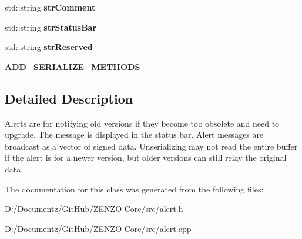 \begin{DoxyCompactItemize}
std\+::string {\bfseries str\+Comment}
\item 
\mbox{\label{class_c_unsigned_alert_a97cfbf9a49b770bb84e49389ac1489c2}} 
std\+::string {\bfseries str\+Status\+Bar}
\item 
\mbox{\label{class_c_unsigned_alert_a0115109fd39d48f37a412d5f50a78828}} 
std\+::string {\bfseries str\+Reserved}
\item 
\mbox{\label{class_c_unsigned_alert_a24489988876bbf2c38a5f379e4057a53}} 
{\bfseries A\+D\+D\+\_\+\+S\+E\+R\+I\+A\+L\+I\+Z\+E\+\_\+\+M\+E\+T\+H\+O\+DS}
\end{DoxyCompactItemize}


\subsection{Detailed Description}
Alerts are for notifying old versions if they become too obsolete and need to upgrade. The message is displayed in the status bar. Alert messages are broadcast as a vector of signed data. Unserializing may not read the entire buffer if the alert is for a newer version, but older versions can still relay the original data. 

The documentation for this class was generated from the following files\+:\begin{DoxyCompactItemize}
\item 
D\+:/\+Documentz/\+Git\+Hub/\+Z\+E\+N\+Z\+O-\/\+Core/src/alert.\+h\item 
D\+:/\+Documentz/\+Git\+Hub/\+Z\+E\+N\+Z\+O-\/\+Core/src/alert.\+cpp\end{DoxyCompactItemize}
